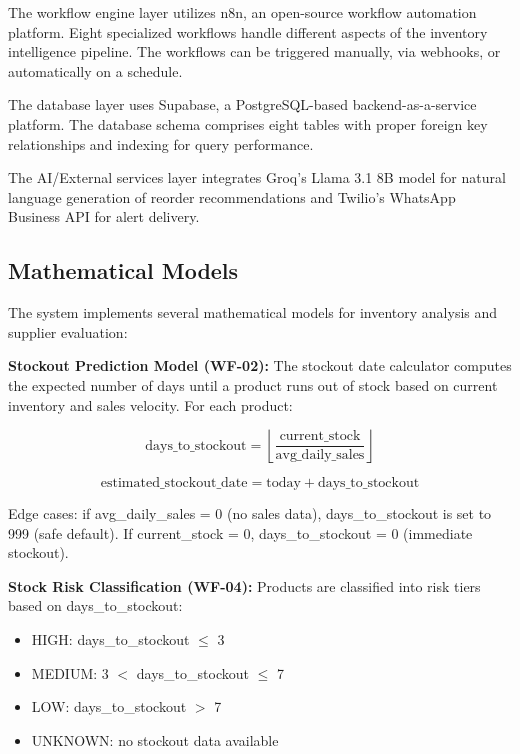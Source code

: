 \documentclass[journal]{IEEEtran}
\begin{document}
The workflow engine layer utilizes n8n, an open-source workflow automation platform. Eight specialized workflows handle different aspects of the inventory intelligence pipeline. The workflows can be triggered manually, via webhooks, or automatically on a schedule.

The database layer uses Supabase, a PostgreSQL-based backend-as-a-service platform. The database schema comprises eight tables with proper foreign key relationships and indexing for query performance.

The AI/External services layer integrates Groq's Llama 3.1 8B model for natural language generation of reorder recommendations and Twilio's WhatsApp Business API for alert delivery.

\subsection{Mathematical Models}

The system implements several mathematical models for inventory analysis and supplier evaluation:

\textbf{Stockout Prediction Model (WF-02):}
The stockout date calculator computes the expected number of days until a product runs out of stock based on current inventory and sales velocity. For each product:

\begin{equation}
\text{days\_to\_stockout} = \left\lfloor \frac{\text{current\_stock}}{\text{avg\_daily\_sales}} \right\rfloor
\end{equation}

\begin{equation}
\text{estimated\_stockout\_date} = \text{today} + \text{days\_to\_stockout}
\end{equation}

Edge cases: if avg\_daily\_sales = 0 (no sales data), days\_to\_stockout is set to 999 (safe default). If current\_stock = 0, days\_to\_stockout = 0 (immediate stockout).

\textbf{Stock Risk Classification (WF-04):}
Products are classified into risk tiers based on days\_to\_stockout:

\begin{itemize}
\item HIGH: days\_to\_stockout $\leq$ 3
\item MEDIUM: 3 $<$ days\_to\_stockout $\leq$ 7
\item LOW: days\_to\_stockout $>$ 7
\item UNKNOWN: no stockout data available
\end{itemize}
\end{document}
